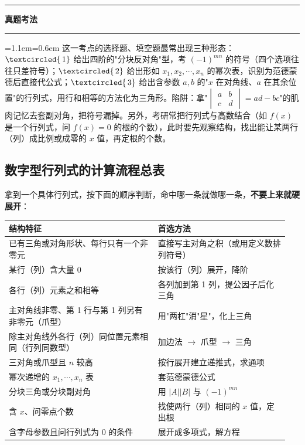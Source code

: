 \documentclass[11pt,openany,UTF8]{ctexbook}
\newcommand{\circled}[1]{\textcircled{\scriptsize\,#1}}
\newcommand{\callouthead}[2]{%
  \par\addvspace{7pt}\noindent
  {\color{#1}\rule[-0.15em]{3pt}{1.05em}}\hspace{0.5em}%
  {\bfseries\color{#1}#2}\par\nobreak\vspace{-0.35em}%
  {\color{rulesep}\hrule height 0.4pt}\nobreak\vspace{0.45em}%
  \begingroup\small\setlength{\parindent}{0pt}%
  \leftskip=1.1em\rightskip=0.6em\noindent\ignorespaces}
\newcommand{\calloutend}{\par\endgroup\addvspace{7pt}}
\newenvironment{callexam}[1]{\callouthead{exambar}{#1}}{\calloutend}
\begin{document}
\begin{callexam}{真题考法}
这一考点的选择题、填空题最常出现三种形态：$\circled{1}$ 给出四阶的"分块反对角"型，考 $(-1)^{mn}$ 的符号（四个选项往往只差符号）；$\circled{2}$ 给出形如 $x_1,x_2,\cdots,x_n$ 的幂次表，识别为范德蒙德后直接代公式；$\circled{3}$ 给出含参数 $a,b$ 的"$x$ 在对角线、$a$ 在其余位置"的行列式，用行和相等的方法化为三角形。陷阱：拿"$\begin{vmatrix}a&b\\c&d\end{vmatrix}=ad-bc$"的肌肉记忆去套副对角，把符号漏掉。另外，考研常把行列式与高数结合（如 $f(x)$ 是一个行列式，问 $f(x)=0$ 的根的个数），此时要先观察结构，找出能让某两行（列）成比例或成零的 $x$ 值，再定根的个数。

\end{callexam}

\subsection{数字型行列式的计算流程总表}

拿到一个具体行列式，按下面的顺序判断，命中哪一条就做哪一条，\textbf{不要上来就硬展开}：

\begingroup\small\setlength{\tabcolsep}{4.0pt}
\begin{longtable}{@{}L{0.5009\linewidth}L{0.4448\linewidth}@{}}
\toprule
\textbf{结构特征} & \textbf{首选方法} \\
\midrule
\endhead
已有三角或对角形状、每行只有一个非零元 & 直接写主对角之积（或用定义数排列符号） \\
某行（列）含大量 $0$ & 按该行（列）展开，降阶 \\
各行（列）元素之和相等 & 各列加到第 1 列，提公因子后化三角 \\
主对角线非零、第 1 行与第 1 列另有非零元（爪型） & 用"两杠"消"星"，化上三角 \\
除主对角线外各行（列）同位置元素相同（行列同数型） & 加边法 $\to$ 爪型 $\to$ 三角 \\
三对角或爪型且 $n$ 较高 & 按行展开建立递推式，求通项 \\
幂次递增的 $x_1,\cdots,x_n$ 表 & 套范德蒙德公式 \\
分块三角或分块副对角 & 用 $\vert A\vert\vert B\vert$ 与 $(-1)^{mn}$ \\
含 $x$、问零点个数 & 找使两行（列）相同的 $x$ 值，定出根 \\
含字母参数且问行列式为 $0$ 的条件 & 展开成多项式，解方程 \\
\bottomrule
\end{longtable}
\endgroup
\end{document}

